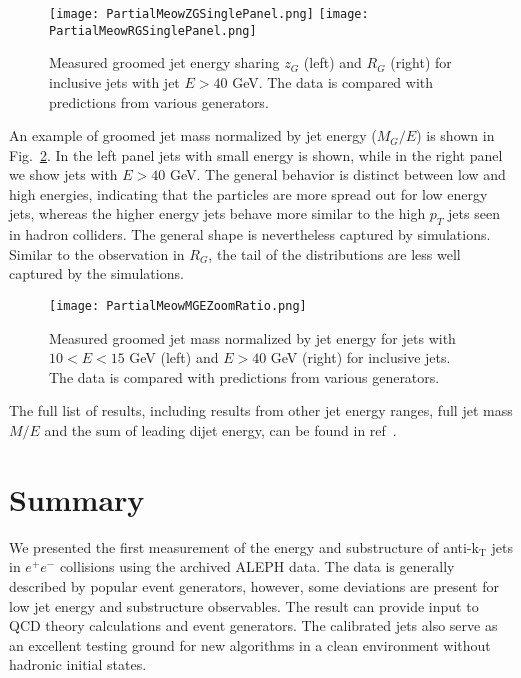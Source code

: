 \documentclass[a4paper,11pt]{article}
\begin{document}
\begin{figure}[ht!]
    \centering
    \texttt{[image: PartialMeowZGSinglePanel.png]}
    \texttt{[image: PartialMeowRGSinglePanel.png]}
    \caption{Measured groomed jet energy sharing $z_G$ (left) and $R_G$ (right) for inclusive jets with jet $E > 40$ GeV.  The data is compared with predictions from various generators.}
    \label{Figure:ResultSubstructure}
\end{figure}

An example of groomed jet mass normalized by jet energy ($M_G/E$) is shown in Fig.~\ref{Figure:ResultMass}.  In the left panel jets with small energy is shown, while in the right panel we show jets with $E > 40$ GeV.  The general behavior is distinct between low and high energies, indicating that the particles are more spread out for low energy jets, whereas the higher energy jets behave more similar to the high $p_T$ jets seen in hadron colliders.  The general shape is nevertheless captured by simulations.  Similar to the observation in $R_G$, the tail of the distributions are less well captured by the simulations.

\begin{figure}[ht!]
    \centering
    \texttt{[image: PartialMeowMGEZoomRatio.png]}
    \caption{Measured groomed jet mass normalized by jet energy for jets with $10 < E < 15$ GeV (left) and $E > 40$ GeV (right) for inclusive jets.  The data is compared with predictions from various generators.}
    \label{Figure:ResultMass}
\end{figure}

The full list of results, including results from other jet energy ranges, full jet mass $M/E$ and the sum of leading dijet energy, can be found in ref~\cite{Chen_2022}.

\section{Summary}

We presented the first measurement of the energy and substructure of anti-k$_\mathrm{T}$ jets in $e^+e^-$ collisions using the archived ALEPH data.
The data is generally described by popular event generators, however, some deviations are present for low jet energy and substructure observables.
The result can provide input to QCD theory calculations and event generators.  The calibrated jets also serve as an excellent testing ground for new algorithms in a clean environment without hadronic initial states.




\end{document}
